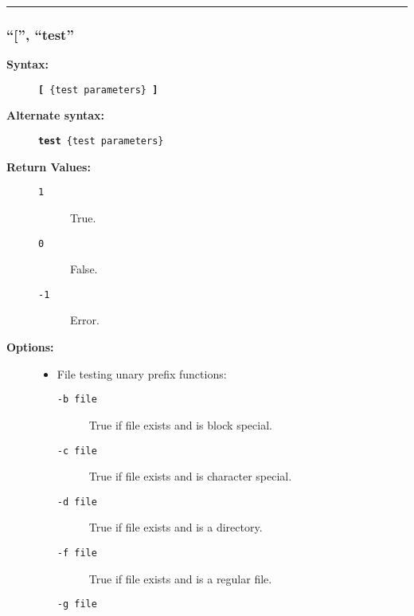 \hrule
\subsubsection{``['', ``test''}

\begin{description}
\item[{\bf Syntax:}] \mbox{}

{\tt {\bf {[}} \{test parameters\} {\bf {]}}}

\item[{\bf Alternate syntax:}] \mbox{}

{\tt {\bf {test}} \{test parameters\}}

\item[{\bf Return Values:}] \mbox{}

\begin{description}
\item[{\tt 1}] \mbox{}

True.

\item[{\tt 0}] \mbox{}

False.

\item[{\tt -1}] \mbox{}

Error.

\end{description}


\item[{\bf Options:}] \mbox{}

\begin{itemize}
\item File testing unary prefix functions:
\begin{description}
\item[{\tt -b file}] \mbox{}

True if file exists and is block special.

\item[{\tt -c file}] \mbox{}

True if file exists and is character special.

\item[{\tt -d file}] \mbox{}

True if file exists and is a directory.

\item[{\tt -f file}] \mbox{}

True if file exists and is a regular file.

\item[{\tt -g file}] \mbox{}


\end{description}
\end{itemize}
\end{description}
